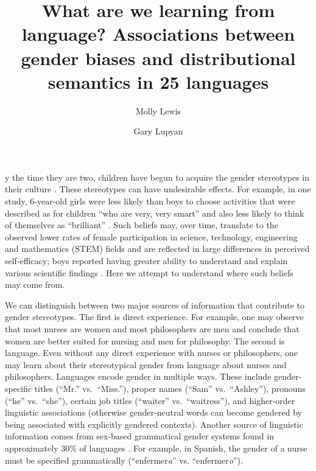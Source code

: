 \documentclass[9pt,twocolumn,twoside]{pnas-new}
\title{What are we learning from language? Associations between gender biases
and distributional semantics in 25 languages}
\author[a,b,1]{Molly Lewis}
\author[b,1,2]{Gary Lupyan}
\affil[a]{University of Chicago}
\affil[b]{University of Wisconsin-Madison}
\begin{document}
\maketitle
\thispagestyle{firststyle}

y the time they are two, children  have begun to acquire the
gender stereotypes in their culture \cite{gelman2004mother}. These
stereotypes can have undesirable effects. For example, in one study,
6-year-old girls were less likely than boys to choose activities that
were described as for children \enquote{who are very, very smart} and
also less likely to think of themselves as \enquote{brilliant}  \cite{bian2017gender}. Such beliefs may, over time, translate to the observed lower rates of female participation in science, technology, engineering and mathematics (STEM) fields \cite{ceci2011understanding,leslie2015expectations,miller2015women,stoet2018gender} and are reflected in large differences in perceived self-efficacy; boys reported having greater ability to understand and explain various scientific findings  \citep[independent of actual ability,][]{stoet2018gender}.  Here we attempt to understand where such beliefs may come from.

We can distinguish between two major sources of information that contribute to gender stereotypes. The first is direct experience. For
example, one may observe that most nurses are women and most
philosophers are men and conclude that women are better suited for
nursing and men for philosophy. The second is language. Even without any
direct experience with nurses or philosophers, one may learn about their
stereotypical gender from language about nurses and philosophers.
Languages encode gender in multiple ways. These include gender-specific
titles (\enquote{Mr.} vs.\ \enquote{Miss.}), proper names (\enquote{Sam}
vs.\ \enquote{Ashley}), pronouns (\enquote{he} vs.\ \enquote{she}),
certain job titles (\enquote{waiter} vs.\ \enquote{waitress}), and
higher-order linguistic associations (otherwise gender-neutral words can
become gendered by being associated with explicitly gendered contexts).
Another source of linguistic information comes from sex-based
grammatical gender systems found in approximately 30\% of languages \cite{wals}. For example, in Spanish, the gender of a
nurse must be specified grammatically (\enquote{enfermer\emph{a}} vs.
\enquote{enfermer\emph{o}}).
\end{document}

